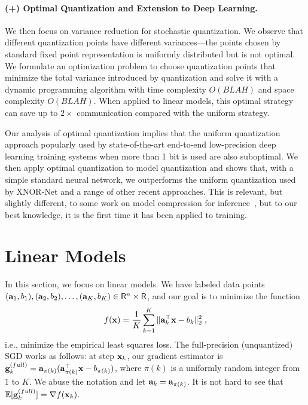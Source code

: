 \documentclass{article}
\newcommand{\R}{\mathsf{R}}
\def\a{{\bf a}}
\def\g{{\bf g}}
\def\x{{\bf x}}
\def\E{\mathbb{E}}
\begin{document}
\vspace{-1em}
\paragraph{(+) Optimal Quantization and Extension to Deep Learning.}
We then focus on variance reduction for 
stochastic quantization. We observe that different
quantization points have different variances---the points chosen
by standard fixed point representation is uniformly
distributed but is not optimal.
We formulate an optimization problem to choose 
quantization points that minimize the total variance
introduced by quantization and solve it with 
a dynamic programming algorithm with time complexity
$O(BLAH)$ and space complexity $O(BLAH)$.
When applied to linear models, this optimal 
strategy can save up to $2\times$ communication
compared with the uniform strategy.

Our analysis of optimal quantization 
implies that the uniform quantization approach
popularly used by state-of-the-art end-to-end
low-precision deep learning training systems
when more than 1 bit is used are also suboptimal.
We then apply optimal quantization to 
model quantization and shows that, with a simple
standard neural network, we outperforms the
uniform quantization used by XNOR-Net and a
range of other recent approaches. This
is relevant, but slightly different, to some work 
on model compression for inference~\cite{Han:2016:ICLR}, 
but to our best knowledge, it is the first time it 
has been applied to training. 

\section{Linear Models}

\vspace{-0.5em}
In this section, we focus on linear models.
We have labeled data points $(\a_1, b_1), (\a_2, b_2), \ldots, (\a_K, b_K) \in \R^n \times \R$, and our goal is to minimize the function
\[
f(\x) = \frac{1}{K} \sum_{k = 1}^K \| \a_k^\top \x - b_k \|_2^2 \; ,
\]
i.e., minimize the empirical least squares loss.
The full-precision (unquantized) SGD works as 
follows: at step $\x_k$, our gradient estimator is $\g_k^{(full)} = \a_{\pi(k)} (\a_{\pi(k)}^\top \x - b_{\pi(k)})$, where $\pi(k)$ is a uniformly random integer from $1$ to $K$.
We abuse the notation and let $\a_k = \a_{\pi(k)}$.
It is not hard to see that $\E [\g_k^{(full)}] = \nabla f(\x_k)$.

\vspace{-1em}
\end{document}
